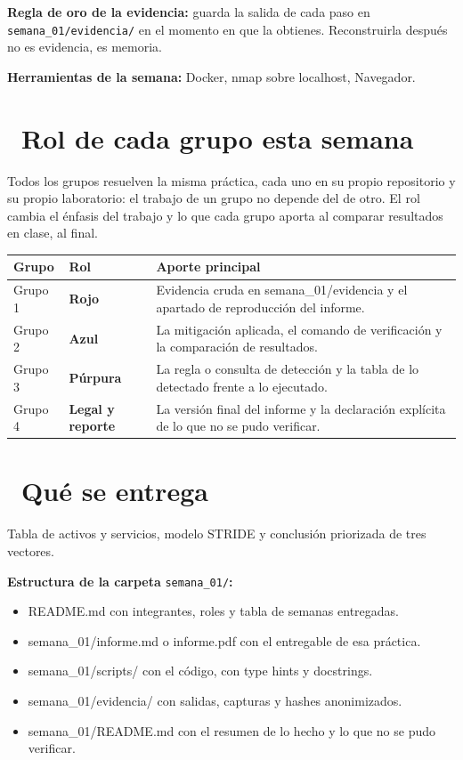 \documentclass[11pt,a4paper]{article}
\newcommand{\iconotexto}[2]{\textcolor{cyanNeon}{\faIcon{#1}}~#2}
\begin{document}
\begin{cajaConcepto}\textbf{Regla de oro de la evidencia:} guarda la salida de cada paso en \texttt{semana\_01/evidencia/} en el momento en que la obtienes. Reconstruirla después no es evidencia, es memoria.
\end{cajaConcepto}

\textbf{Herramientas de la semana:} Docker, nmap sobre localhost, Navegador.

\section{\iconotexto{users}{Rol de cada grupo esta semana}}

Todos los grupos resuelven la misma práctica, cada uno en su propio repositorio y su propio laboratorio: el trabajo de un grupo no depende del de otro. El rol cambia el énfasis del trabajo y lo que cada grupo aporta al comparar resultados en clase, al final.

\begin{tabularx}{\linewidth}{@{}l l X@{}}
\toprule
Grupo & Rol & Aporte principal\\
\midrule
Grupo 1 & \textbf{Rojo} & Evidencia cruda en semana\_01/evidencia y el apartado de reproducción del informe. \\
Grupo 2 & \textbf{Azul} & La mitigación aplicada, el comando de verificación y la comparación de resultados. \\
Grupo 3 & \textbf{Púrpura} & La regla o consulta de detección y la tabla de lo detectado frente a lo ejecutado. \\
Grupo 4 & \textbf{Legal y reporte} & La versión final del informe y la declaración explícita de lo que no se pudo verificar. \\
\bottomrule
\end{tabularx}

\section{\iconotexto{box-open}{Qué se entrega}}

Tabla de activos y servicios, modelo STRIDE y conclusión priorizada de tres vectores.

\textbf{Estructura de la carpeta} \texttt{semana\_01/}\textbf{:}

\begin{itemize}[leftmargin=1.4em,itemsep=2pt,topsep=3pt]
  \item README.md con integrantes, roles y tabla de semanas entregadas.
  \item semana\_01/informe.md o informe.pdf con el entregable de esa práctica.
  \item semana\_01/scripts/ con el código, con type hints y docstrings.
  \item semana\_01/evidencia/ con salidas, capturas y hashes anonimizados.
  \item semana\_01/README.md con el resumen de lo hecho y lo que no se pudo verificar.
\end{itemize}
\end{document}
